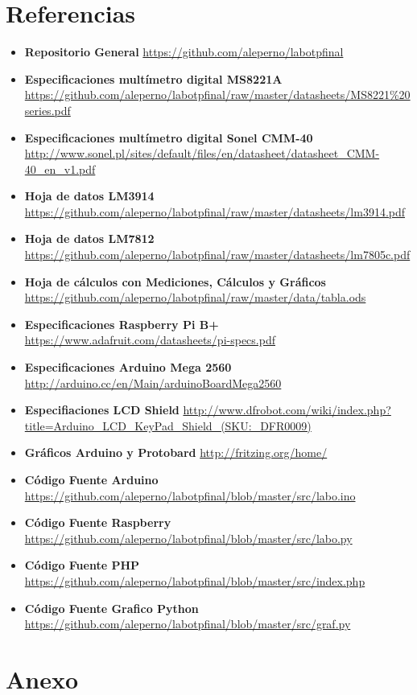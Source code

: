 \documentclass[12pt,a4paper]{article}
\begin{document}
	\section{Referencias}
		\label{sec:referencias}
		\begin{itemize}
		\item \textbf{Repositorio General} \url{https://github.com/aleperno/labotpfinal}
		\item \textbf{Especificaciones multímetro digital MS8221A} \url{https://github.com/aleperno/labotpfinal/raw/master/datasheets/MS8221%20series.pdf}
		\item \textbf{Especificaciones multímetro digital Sonel CMM-40} \url{http://www.sonel.pl/sites/default/files/en/datasheet/datasheet_CMM-40_en_v1.pdf}
		\item \textbf{Hoja de datos LM3914} \url{https://github.com/aleperno/labotpfinal/raw/master/datasheets/lm3914.pdf}
		\item \textbf{Hoja de datos LM7812} \url{https://github.com/aleperno/labotpfinal/raw/master/datasheets/lm7805c.pdf}
		\item \textbf{Hoja de cálculos con Mediciones, Cálculos y Gráficos} \url{https://github.com/aleperno/labotpfinal/raw/master/data/tabla.ods}
		\item \textbf{Especificaciones Raspberry Pi B+} \url{https://www.adafruit.com/datasheets/pi-specs.pdf}
		\item \textbf{Especificaciones Arduino Mega 2560} \url{http://arduino.cc/en/Main/arduinoBoardMega2560}
		\item \textbf{Especifiaciones LCD Shield} \url{http://www.dfrobot.com/wiki/index.php?title=Arduino_LCD_KeyPad_Shield_(SKU:_DFR0009)}
		\item \textbf{Gráficos Arduino y Protobard} \url{http://fritzing.org/home/}
		\item \textbf{Código Fuente Arduino} \url{https://github.com/aleperno/labotpfinal/blob/master/src/labo.ino}
		\item \textbf{Código Fuente Raspberry} \url{https://github.com/aleperno/labotpfinal/blob/master/src/labo.py}
		\item \textbf{Código Fuente PHP} \url{https://github.com/aleperno/labotpfinal/blob/master/src/index.php}
		\item \textbf{Código Fuente Grafico Python} \url{https://github.com/aleperno/labotpfinal/blob/master/src/graf.py}
		\end{itemize}

	\newpage\null\thispagestyle{empty}\newpage
	\section{Anexo}\label{sec:anexo}
\end{document}
